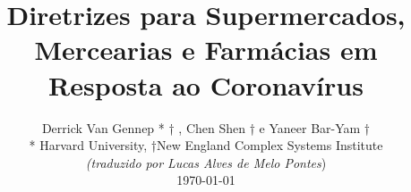 \documentclass[onecolumn,journal]{IEEEtran}
\begin{document}
\title{\color{Brown}  Diretrizes para Supermercados, Mercearias e Farmácias em Resposta ao Coronavírus
\vspace{-0.35ex}}
\author{Derrick Van Gennep * † , Chen Shen † e Yaneer Bar-Yam † \\ * Harvard University, †New England Complex Systems Institute \\
\vspace{+0.35ex}
\small{\textit{(traduzido por Lucas Alves de Melo Pontes})}\\
 \today
  \vspace{-8ex} \\
\textbf{}
 }

\maketitle




\thispagestyle{empty} %




\end{document}
